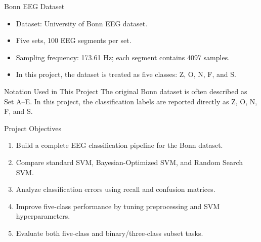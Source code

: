 \documentclass[10pt,aspectratio=169]{beamer}
\begin{document}
\begin{frame}{Bonn EEG Dataset}
  \begin{itemize}
    \item Dataset: University of Bonn EEG dataset.
    \item Five sets, 100 EEG segments per set.
    \item Sampling frequency: 173.61 Hz; each segment contains 4097 samples.
    \item In this project, the dataset is treated as five classes: Z, O, N, F, and S.
  \end{itemize}

  \begin{table}
    \centering
    \scriptsize
  \end{table}

  \begin{block}{Notation Used in This Project}
    The original Bonn dataset is often described as Set A--E. In this project, the classification labels are reported directly as Z, O, N, F, and S.
  \end{block}
\end{frame}

\begin{frame}{Project Objectives}
  \begin{enumerate}
    \item Build a complete EEG classification pipeline for the Bonn dataset.
    \item Compare standard SVM, Bayesian-Optimized SVM, and Random Search SVM.
    \item Analyze classification errors using recall and confusion matrices.
    \item Improve five-class performance by tuning preprocessing and SVM hyperparameters.
    \item Evaluate both five-class and binary/three-class subset tasks.
  \end{enumerate}
\end{frame}
\end{document}
